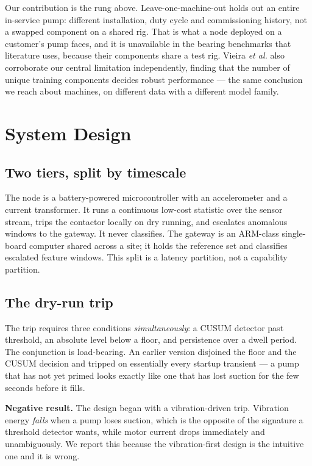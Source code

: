 \documentclass[conference,a4paper,10pt]{IEEEtran}
\begin{document}
Our contribution is the rung above. Leave-one-machine-out holds out an entire
in-service pump: different installation, duty cycle and commissioning history,
not a swapped component on a shared rig. That is what a node deployed on a
customer's pump faces, and it is unavailable in the bearing benchmarks that
literature uses, because their components share a test rig. Vieira
\emph{et al.} also corroborate our central limitation independently, finding that
the number of unique training components decides robust performance --- the same
conclusion we reach about machines, on different data with a different model
family.

\section{System Design}
\subsection{Two tiers, split by timescale}
The node is a battery-powered microcontroller with an accelerometer and a current
transformer. It runs a continuous low-cost statistic over the sensor stream,
trips the contactor locally on dry running, and escalates anomalous windows to
the gateway. It never classifies. The gateway is an ARM-class single-board
computer shared across a site; it holds the reference set and classifies
escalated feature windows. This split is a latency partition, not a capability
partition.

\subsection{The dry-run trip}
The trip requires three conditions \emph{simultaneously}: a CUSUM detector past
threshold, an absolute level below a floor, and persistence over a dwell period.
The conjunction is load-bearing. An earlier version disjoined the floor and the
CUSUM decision and tripped on essentially every startup transient --- a pump that
has not yet primed looks exactly like one that has lost suction for the few
seconds before it fills.

\textbf{Negative result.} The design began with a vibration-driven trip.
Vibration energy \emph{falls} when a pump loses suction, which is the opposite of
the signature a threshold detector wants, while motor current drops immediately
and unambiguously. We report this because the vibration-first design is the
intuitive one and it is wrong.
\end{document}
